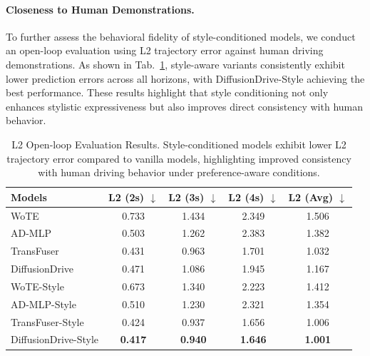 \documentclass{article}
\begin{document}
\paragraph{Closeness to Human Demonstrations.}
To further assess the behavioral fidelity of style-conditioned models, we conduct an open-loop evaluation using L2 trajectory error against human driving demonstrations. As shown in Tab.~\ref{tab:ole}, style-aware variants consistently exhibit lower prediction errors across all horizons, with DiffusionDrive-Style achieving the best performance. These results highlight that style conditioning not only enhances stylistic expressiveness but also improves direct consistency with human behavior.

\begin{table}[htbp]
  \centering
  \caption{L2 Open-loop Evaluation Results. Style-conditioned models exhibit lower L2 trajectory error compared to vanilla models, highlighting improved consistency with human driving behavior under preference-aware conditions.}
    \begin{tabular}{l|ccc|c}
    \hline
    \hline
    Models & L2 (2s) $\downarrow$ & L2 (3s) $\downarrow$ & L2 (4s) $\downarrow$ & L2 (Avg) $\downarrow$ \\
    \hline

    WoTE \cite{li2025end} &  0.733     &  1.434    &  2.349     &   1.506 \\
    
    AD-MLP \cite{zhai2023rethinking} &  0.503     &  1.262     &  2.383     &   1.382 \\
    
    TransFuser \cite{chitta2022transfuser}    &  0.431      &  0.963      & 1.701      &   1.032     \\
    
    DiffusionDrive \cite{liao2024diffusiondrive}    &  0.471       &  1.086      & 1.945      &   1.167       \\ \hline

    WoTE-Style &  0.673     &  1.340     &  2.223     &   1.412 \\
    
    AD-MLP-Style &  0.510     &  1.230     &  2.321     &   1.354    \\
    
    TransFuser-Style    &  0.424     &  0.937      & 1.656      &   1.006     \\
    
    DiffusionDrive-Style    &  \textbf{0.417}       &  \textbf{0.940}      & \textbf{1.646}      &   \textbf{1.001}       \\
    \hline
    \hline
    \end{tabular}
  \label{tab:ole}
\end{table}
\end{document}
